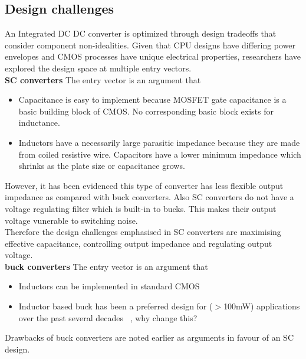 \documentclass[letterpaper,twocolumn,10pt]{article}
\begin{document}
\subsection{Design challenges}
An Integrated DC DC converter is optimized through design tradeoffs that consider component non-idealities. Given that CPU designs have differing power envelopes and CMOS processes have unique electrical properties, researchers have explored the design space at multiple entry vectors.\\  
\indent \textbf{SC converters} The entry vector is an argument that
\begin{itemize}
\item{Capacitance is easy to implement because MOSFET gate capacitance is a basic building block of CMOS. No corresponding basic block exists for inductance.}
\item{Inductors have a necessarily large parasitic impedance because they are made from coiled resistive wire. Capacitors have a lower minimum impedance which shrinks as the plate size or capacitance grows.}
\end{itemize}
 
However, it has been evidenced this type of converter has less flexible output impedance as compared with buck converters. Also SC converters do not have a voltage regulating filter which is built-in to bucks. This makes their output voltage vunerable to switching noise.\\
Therefore the design challenges emphasised in SC converters are maximising effective capacitance, controlling output impedance and regulating output voltage.\\ 
\textbf{buck converters} The entry vector is an argument that
\begin{itemize}
\item{Inductors can be implemented in standard CMOS} 
\item{Inductor based buck has been a preferred design for ($>$100mW) applications over the past several decades ~\cite{Sanders2010}, why change this?}
\end{itemize}

Drawbacks of buck converters are noted earlier as arguments in favour of an SC design.
\end{document}
